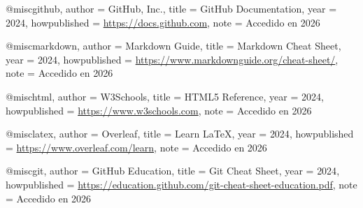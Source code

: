 @misc{github,
  author       = {{GitHub, Inc.}},
  title        = {GitHub Documentation},
  year         = {2024},
  howpublished = {\url{https://docs.github.com}},
  note         = {Accedido en 2026}
}

@misc{markdown,
  author       = {{Markdown Guide}},
  title        = {Markdown Cheat Sheet},
  year         = {2024},
  howpublished = {\url{https://www.markdownguide.org/cheat-sheet/}},
  note         = {Accedido en 2026}
}

@misc{html,
  author       = {{W3Schools}},
  title        = {HTML5 Reference},
  year         = {2024},
  howpublished = {\url{https://www.w3schools.com}},
  note         = {Accedido en 2026}
}

@misc{latex,
  author       = {{Overleaf}},
  title        = {Learn LaTeX},
  year         = {2024},
  howpublished = {\url{https://www.overleaf.com/learn}},
  note         = {Accedido en 2026}
}

@misc{git,
  author       = {{GitHub Education}},
  title        = {Git Cheat Sheet},
  year         = {2024},
  howpublished = {\url{https://education.github.com/git-cheat-sheet-education.pdf}},
  note         = {Accedido en 2026}
}